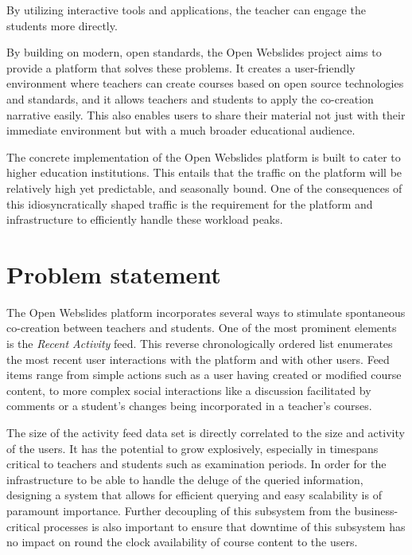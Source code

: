 By utilizing interactive tools and applications, the teacher can engage the students more directly.

By building on modern, open standards, the Open Webslides project \autocite{OpenWebslides2017} aims to provide a platform that solves these problems.
It creates a user-friendly environment where teachers can create courses based on open source technologies and standards, and it allows teachers and students to apply the co-creation narrative easily.
This also enables users to share their material not just with their immediate environment but with a much broader educational audience.

The concrete implementation of the Open Webslides platform is built to cater to higher education institutions.
This entails that the traffic on the platform will be relatively high yet predictable, and seasonally bound.
One of the consequences of this idiosyncratically shaped traffic is the requirement for the platform and infrastructure to efficiently handle these workload peaks.

\section{Problem statement}
\label{sec:problem-statement}

The Open Webslides platform incorporates several ways to stimulate spontaneous co-creation between teachers and students.
One of the most prominent elements is the \textit{Recent Activity} feed.
This reverse chronologically ordered list enumerates the most recent user interactions with the platform and with other users.
Feed items range from simple actions such as a user having created or modified course content, to more complex social interactions like a discussion facilitated by comments or a student's changes being incorporated in a teacher's courses.

The size of the activity feed data set is directly correlated to the size and activity of the users.
It has the potential to grow explosively, especially in timespans critical to teachers and students such as examination periods.
In order for the infrastructure to be able to handle the deluge of the queried information, designing a system that allows for efficient querying and easy scalability is of paramount importance.
Further decoupling of this subsystem from the business-critical processes is also important to ensure that downtime of this subsystem has no impact on round the clock availability of course content to the users.


